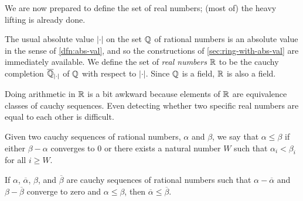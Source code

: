 We are now prepared to define the set of real numbers; (most of) the heavy lifting is already done.

\begin{dfn} \label{dfn:real-numbers}
The usual absolute value \(|\cdot|\) on the set \(\mathbb{Q}\) of rational numbers is an absolute value in the sense of \ref{dfn:abs-val}, and so the constructions of \autoref{sec:ring-with-abs-val} are immediately available.
We define the set of \emph{real numbers} \(\mathbb{R}\) to be the cauchy completion \(\overline{\mathbb{Q}}_{|\cdot|}\) of \(\mathbb{Q}\) with respect to \(|\cdot|\).
Since \(\mathbb{Q}\) is a field, \(\mathbb{R}\) is also a field.
\end{dfn}

Doing arithmetic in \(\mathbb{R}\) is a bit awkward because elements of \(\mathbb{R}\) are equivalence classes of cauchy sequences.
Even detecting whether two specific real numbers are equal to each other is difficult.

\begin{dfn}
Given two cauchy sequences of rational numbers, \(\alpha\) and \(\beta\), we say that \(\alpha \leq \beta\) if either \(\beta - \alpha\) converges to 0 or there exists a natural number \(W\) such that \(\alpha_i < \beta_i\) for all \(i \geq W\).
\end{dfn}

\begin{prop}
If \(\alpha\), \(\overline{\alpha}\), \(\beta\), and \(\overline{\beta}\) are cauchy sequences of rational numbers such that \(\alpha - \overline{\alpha}\) and \(\beta - \overline{\beta}\) converge to zero and \(\alpha \leq \beta\), then \(\overline{\alpha} \leq \overline{\beta}\).
\end{prop}

